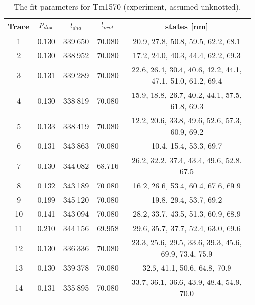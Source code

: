 \begin{table}
    \tiny
    \centering
    \caption{The fit parameters for Tm1570 (experiment, assumed unknotted).}
    \label{tab:tm1570-fit-parameters-exp-unknotted}
    \begin{tabular}{c|c|c|c|c}
        \textbf{Trace} & $p_{dna}$ & $l_{dna}$ & $l_{prot}$ & states [nm]\\\hline
        1 & 0.130 & 339.650 & 70.080 & 20.9, 27.8, 50.8, 59.5, 62.2, 68.1\\
        2 & 0.130 & 338.952 & 70.080 & 17.2, 24.0, 40.3, 44.4, 62.2, 69.3\\
        3 & 0.131 & 339.289 & 70.080 & 22.6, 26.4, 30.4, 40.6, 42.2, 44.1, 47.1, 51.0, 61.2, 69.4\\
        4 & 0.130 & 338.819 & 70.080 & 15.9, 18.8, 26.7, 40.2, 44.1, 57.5, 61.8, 69.3\\
        5 & 0.133 & 338.419 & 70.080 & 12.2, 20.6, 33.8, 49.6, 52.6, 57.3, 60.9, 69.2\\
        6 & 0.131 & 343.863 & 70.080 & 10.4, 15.4, 53.3, 69.7\\
        7 & 0.130 & 344.082 & 68.716 & 26.2, 32.2, 37.4, 43.4, 49.6, 52.8, 67.5\\
        8 & 0.132 & 343.189 & 70.080 & 16.2, 26.6, 53.4, 60.4, 67.6, 69.9\\
        9 & 0.199 & 345.120 & 70.080 & 19.8, 29.4, 53.7, 69.2\\
        10 & 0.141 & 343.094 & 70.080 & 28.2, 33.7, 43.5, 51.3, 60.9, 68.9\\
        11 & 0.210 & 344.156 & 69.958 & 29.6, 35.7, 37.7, 52.4, 63.0, 69.6\\
        12 & 0.130 & 336.336 & 70.080 & 23.3, 25.6, 29.5, 33.6, 39.3, 45.6, 69.9, 73.4, 75.9\\
        13 & 0.130 & 339.378 & 70.080 & 32.6, 41.1, 50.6, 64.8, 70.9\\
        14 & 0.131 & 335.895 & 70.080 & 33.7, 36.1, 36.6, 43.9, 48.4, 54.9, 70.0\\
    \end{tabular}
\end{table}

